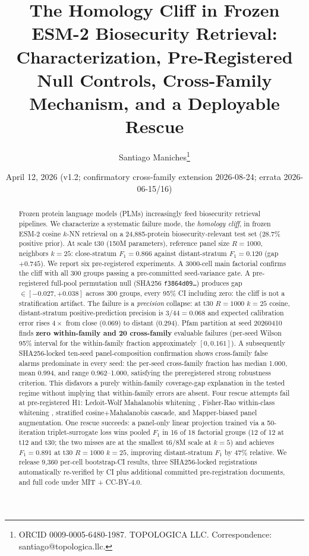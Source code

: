 \documentclass[11pt]{article}
\title{The Homology Cliff in Frozen ESM-2 Biosecurity Retrieval: Characterization, Pre-Registered Null Controls, Cross-Family Mechanism, and a Deployable Rescue}
\author{Santiago Maniches\thanks{ORCID 0009-0005-6480-1987. TOPOLOGICA LLC. Correspondence: santiago@topologica.llc.}}
\date{April 12, 2026 (v1.2; confirmatory cross-family extension 2026-08-24; errata 2026-06-15/16)}
\begin{document}
\maketitle

\begin{abstract}
Frozen protein language models (PLMs) increasingly feed biosecurity retrieval pipelines. We characterize a systematic failure mode, the \emph{homology cliff}, in frozen ESM-2 \cite{lin2023evolutionary} cosine $k$-NN retrieval on a 24{,}885-protein biosecurity-relevant test set (28.7\% positive prior). At scale t30 (150M parameters), reference panel size $R=1000$, neighbors $k=25$: close-stratum $F_1=0.866$ against distant-stratum $F_1=0.120$ (gap $+0.745$). We report six pre-registered experiments. A 3000-cell main factorial confirms the cliff with all 300 groups passing a pre-committed seed-variance gate. A pre-registered full-pool permutation null (SHA256 \texttt{f3864d09\ldots}) produces gap $\in [-0.027, +0.038]$ across 300 groups, every 95\% CI including zero: the cliff is not a stratification artifact. The failure is a \emph{precision} collapse: at t30 $R=1000$ $k=25$ cosine, distant-stratum positive-prediction precision is $3/44=0.068$ and expected calibration error rises $4\times$ from close (0.069) to distant (0.294). Pfam partition at seed 20260410 finds \textbf{zero within-family and 20 cross-family} evaluable failures (per-seed Wilson 95\% interval for the within-family fraction approximately $[0,0.161]$). A subsequently SHA256-locked ten-seed panel-composition confirmation shows cross-family false alarms predominate in every seed: the per-seed cross-family fraction has median 1.000, mean 0.994, and range 0.962--1.000, satisfying the preregistered strong robustness criterion. This disfavors a purely within-family coverage-gap explanation in the tested regime without implying that within-family errors are absent. Four rescue attempts fail at pre-registered H1: Ledoit-Wolf Mahalanobis whitening \cite{ledoit2004}, Fisher-Rao within-class whitening \cite{amari2016}, stratified cosine+Mahalanobis cascade, and Mapper-biased panel augmentation. One rescue succeeds: a panel-only linear projection trained via a 50-iteration triplet-surrogate loss \cite{schroff2015facenet} wins pooled $F_1$ in 16 of 18 factorial groups (12 of 12 at t12 and t30; the two misses are at the smallest t6/8M scale at $k=5$) and achieves $F_1=0.891$ at t30 $R=1000$ $k=25$, improving distant-stratum $F_1$ by 47\% relative. We release 9{,}360 per-cell bootstrap-CI results, three SHA256-locked registrations automatically re-verified by CI plus additional committed pre-registration documents, and full code under MIT + CC-BY-4.0.
\end{abstract}
\end{document}
